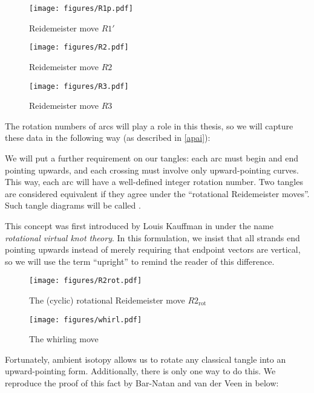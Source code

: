 \begin{figure}[h]
        \centering
        \texttt{[image: figures/R1p.pdf]}
        \caption{Reidemeister move $R1'$}
        \label{fig:R1p}
\end{figure}
\begin{figure}[h]
        \centering
        \texttt{[image: figures/R2.pdf]}
        \caption{Reidemeister move $R2$}
        \label{fig:R2}
\end{figure}
\begin{figure}[h]
        \centering
        \texttt{[image: figures/R3.pdf]}
        \caption{Reidemeister move $R3$}
        \label{fig:R3}
\end{figure}

The rotation numbers of arcs will play a role in this thesis, so we will capture
these data in the following way (as described in \cref{apai}):

\begin{definition}
        We will put a further requirement on our tangles: each arc must begin and end
        pointing upwards, and each crossing must involve only upward-pointing curves.
        This way, each arc will have a well-defined integer rotation number.
        Two tangles are considered equivalent if they agree under the
        \enquote{rotational Reidemeister moves}. Such tangle diagrams will be
        called .
\end{definition}
\begin{remark}
        This concept was first introduced by Louis Kauffman in \cite{LK} under
        the name \emph{rotational virtual knot theory}. In this formulation, we
        insist that all strands end pointing upwards instead of merely requiring
        that endpoint vectors are vertical, so we will use the term
        \enquote{upright} to remind the reader of this difference.
\end{remark}
\begin{figure}[h]
        \centering
        \texttt{[image: figures/R2rot.pdf]}
        \caption{The (cyclic) rotational Reidemeister move $R2_{\text{rot}}$}
        \label{fig:R2rot}
\end{figure}
\begin{figure}[h]
        \centering
        \texttt{[image: figures/whirl.pdf]}
        \caption{The whirling move}
        \label{fig:whirl}
\end{figure}

Fortunately, ambient isotopy allows us to rotate any classical tangle into an
upward-pointing form. Additionally, there is only one way to do this. We
reproduce the proof of this fact by Bar-Natan and van der Veen in \cite{BV}
below:

